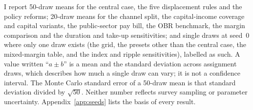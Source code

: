 I report 50-draw means for the central case, the five displacement rules and the policy reforms; 20-draw means for the channel split, the capital-income coverage and capital variants, the public-sector pay bill, the OBR benchmark, the margin comparison and the duration and take-up sensitivities; and single draws at seed~0 where only one draw exists (the grid, the presets other than the central case, the mixed-margin table, and the index and ripple sensitivities), labelled as such. A value written ``$a \pm b$'' is a mean and the standard deviation across assignment draws, which describes how much a single draw can vary; it is not a confidence interval. The Monte Carlo standard error of a 50-draw mean is that standard deviation divided by $\sqrt{50}$. Neither number reflects survey sampling or parameter uncertainty. Appendix~\ref{app:seeds} lists the basis of every result.
